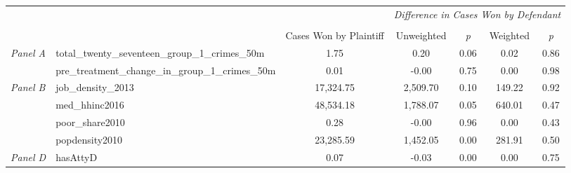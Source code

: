 \begin{tabular}{llccccc}
\toprule
 &  & \textit{} & \multicolumn{4}{c}{\textit{Difference in Cases Won by Defendant}} \\
\cline{4-7}
\\
 &  & Cases Won by Plaintiff & Unweighted & \emph{p} & Weighted & \emph{p} \\
\midrule
\multirow[c]{2}{3cm}{\textit{Panel A}} & total_twenty_seventeen_group_1_crimes_50m & 1.75 & 0.20 & 0.06 & 0.02 & 0.86 \\
 & pre_treatment_change_in_group_1_crimes_50m & 0.01 & -0.00 & 0.75 & 0.00 & 0.98 \\
\cline{1-7}
\multirow[c]{4}{3cm}{\textit{Panel B}} & job_density_2013 & 17,324.75 & 2,509.70 & 0.10 & 149.22 & 0.92 \\
 & med_hhinc2016 & 48,534.18 & 1,788.07 & 0.05 & 640.01 & 0.47 \\
 & poor_share2010 & 0.28 & -0.00 & 0.96 & 0.00 & 0.43 \\
 & popdensity2010 & 23,285.59 & 1,452.05 & 0.00 & 281.91 & 0.50 \\
\cline{1-7}
\textit{Panel D} & hasAttyD & 0.07 & -0.03 & 0.00 & 0.00 & 0.75 \\
\cline{1-7}
\bottomrule
\end{tabular}
